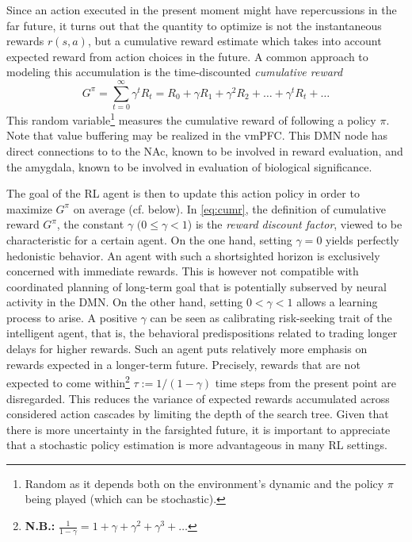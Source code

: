 \documentclass[10pt,letterpaper]{article}
\begin{document}
Since an action executed in the present moment might have repercussions in the far future, it turns out that the
quantity to optimize is not the instantaneous rewards $r(s, a)$, but a
cumulative reward estimate which takes into account expected reward
from action choices in the future.
A common approach to
modeling this accumulation is the time-discounted \textit{cumulative reward}%
\begin{equation}
  \label{eq:cumr}
  G^\pi = \sum_{t=0}^{\infty}\gamma^{t}R_t = R_0 + \gamma R_1 + \gamma^2 R_2 + \ldots + \gamma^tR_t + \ldots
\end{equation}
This random variable\footnote{Random as it depends both on the environment's dynamic and the
  policy $\pi$ being played (which can be stochastic).}  measures the cumulative reward of
following a policy $\pi$.
%
Note that value buffering may be realized in the vmPFC.
This DMN node has direct connections to
to the NAc, known to be involved in reward evaluation,
and
the amygdala, known to be involved in evaluation of biological significance.


The goal of the RL agent is then to update this action policy in order
to maximize $G^\pi$ on average (cf. below). In \eqref{eq:cumr},
the definition of cumulative reward $G^\pi$,
the constant $\gamma$ $(0 \le \gamma < 1$) is the \textit{reward discount factor},
viewed to be characteristic for a certain agent.
On the one hand,
setting $\gamma = 0$ yields perfectly hedonistic behavior.
An agent with such a shortsighted horizon is exclusively
concerned with immediate rewards.
This is however not compatible with coordinated planning of long-term goal that is
potentially subserved by neural activity in the DMN.
On the other hand,
setting $0 < \gamma < 1$ allows a learning process to arise.
A positive $\gamma$ can be seen as calibrating risk-seeking trait of the intelligent agent,
that is, the behavioral predispositions related to trading longer delays for higher rewards.
Such an agent puts relatively more emphasis on rewards expected in
a longer-term future.
Precisely, rewards that are not expected to come within\footnote{\textbf{N.B.:} $\frac{1}{1-\gamma} = 1 + \gamma + \gamma^2 + \gamma^3 + \ldots$}
$\tau := 1/(1 - \gamma)$
time steps from the present point are disregarded. This reduces the variance of expected rewards accumulated across
considered action cascades by limiting the depth of the search tree.
Given that there is more uncertainty in the farsighted future,
it is important to appreciate that a stochastic policy estimation
is more advantageous in many RL settings.
\end{document}
